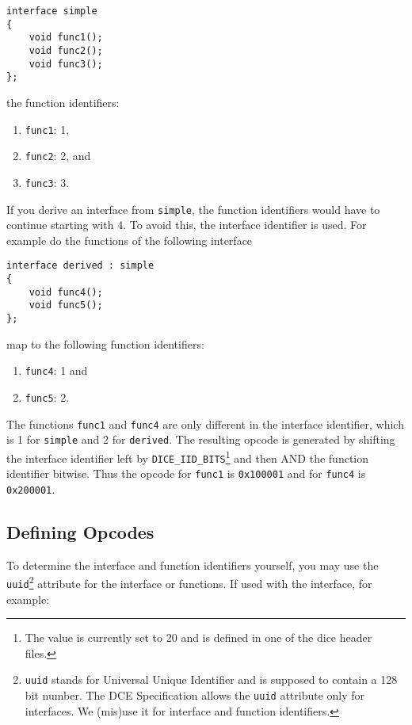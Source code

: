 \begin{verbatim}
interface simple
{
    void func1();
    void func2();
    void func3();
};
\end{verbatim}

the function identifiers:

\begin{enumerate}
\item \verb|func1|: 1,
\item \verb|func2|: 2, and
\item \verb|func3|: 3.
\end{enumerate}

If you derive an interface from \verb|simple|, the function identifiers
would have to continue starting with 4. To avoid this, the interface identifier
is used. For example do the functions of the following interface

\begin{verbatim}
interface derived : simple
{
    void func4();
    void func5();
};
\end{verbatim}

map to the following function identifiers:

\begin{enumerate}
\item \verb|func4|: 1 and
\item \verb|func5|: 2.
\end{enumerate}

The functions \verb|func1| and \verb|func4| are only different in the
interface identifier, which is 1 for \verb|simple| and 2 for 
\verb|derived|. The resulting opcode is generated by shifting the 
interface identifier left by \verb|DICE_IID_BITS|\footnote{The value
is currently set to 20 and is defined in one of the dice header files.}
and then AND the function identifier bitwise. Thus the opcode for 
\verb|func1| is \verb|0x100001| and for \verb|func4| is \verb|0x200001|.

\subsection{Defining Opcodes}
\label{sec:uuid}
To determine the interface and function identifiers yourself,
you may use the \verb|uuid|\footnote{{\tt uuid} stands for Universal
Unique Identifier and is supposed to contain a 128 bit number. The DCE
Specification allows the {\tt uuid} attribute only for interfaces. We
(mis)use it for interface and function identifiers.} attribute for the 
interface or functions. If used with the interface, for example:

